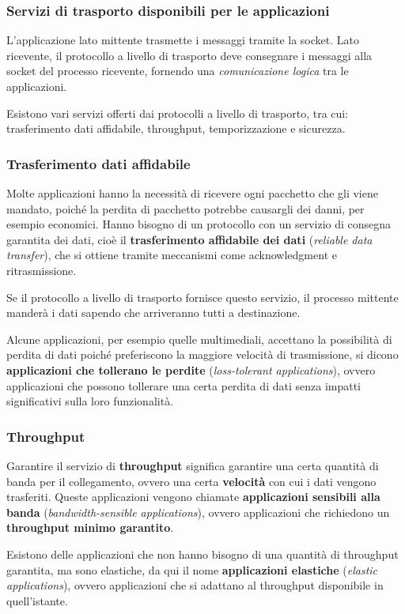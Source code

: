 \subsubsection{Servizi di trasporto disponibili per le applicazioni}
L'applicazione lato mittente trasmette i messaggi tramite la socket. Lato ricevente, il protocollo a livello di trasporto deve consegnare i messaggi alla socket del processo ricevente, fornendo una \textit{comunicazione logica} tra le applicazioni.

Esistono vari servizi offerti dai protocolli a livello di trasporto, tra cui: trasferimento dati affidabile, throughput, temporizzazione e sicurezza.

\subsubsection*{Trasferimento dati affidabile}
Molte applicazioni hanno la necessità di ricevere ogni pacchetto che gli viene mandato, poiché la perdita di pacchetto potrebbe causargli dei danni, per esempio economici. Hanno bisogno di un protocollo con un servizio di consegna garantita dei dati, cioè il \textbf{trasferimento affidabile dei dati} (\textit{reliable data transfer}), che si ottiene tramite meccanismi come acknowledgment e ritrasmissione.

Se il protocollo a livello di trasporto fornisce questo servizio, il processo mittente manderà i dati sapendo che arriveranno tutti a destinazione.

Alcune applicazioni, per esempio quelle multimediali, accettano la possibilità di perdita di dati poiché preferiscono la maggiore velocità di trasmissione, si dicono \textbf{applicazioni che tollerano le perdite} (\textit{loss-tolerant applications}), ovvero applicazioni che possono tollerare una certa perdita di dati senza impatti significativi sulla loro funzionalità.

\subsubsection*{Throughput}
Garantire il servizio di \textbf{throughput} significa garantire una certa quantità di banda per il collegamento, ovvero una certa \textbf{velocità} con cui i dati vengono trasferiti. Queste applicazioni vengono chiamate \textbf{applicazioni sensibili alla banda} (\textit{bandwidth-sensible applications}), ovvero applicazioni che richiedono un \textbf{throughput minimo garantito}.

Esistono delle applicazioni che non hanno bisogno di una quantità di throughput garantita, ma sono elastiche, da qui il nome \textbf{applicazioni elastiche} (\textit{elastic applications}), ovvero applicazioni che si adattano al throughput disponibile in quell'istante.

